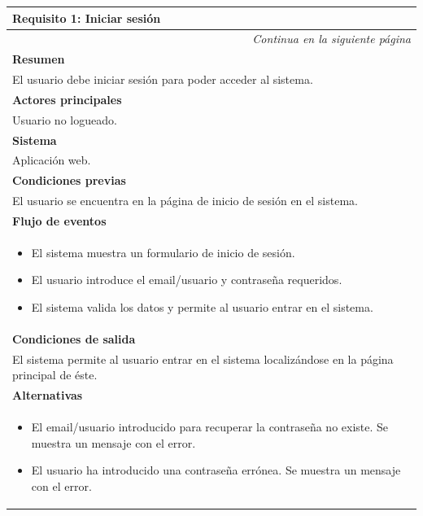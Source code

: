 \begin{longtable}{|p{}|}
\hline
 \rowcolor[gray]{.5}
 \color{white}\textbf{Requisito 1: Iniciar sesión} \\
\hline
\endfirsthead
\endhead
\hline \multicolumn{1}{r}{\textit{Continua en la siguiente página}} \\
\endfoot
\endlastfoot
    \rowcolor[gray]{.9}
     \textbf{Resumen}  \\
     \hline
     El usuario debe iniciar sesión para poder acceder al sistema. \\
     \hline
     \rowcolor[gray]{.9}
     \textbf{Actores principales} \\
     \hline
     Usuario no logueado. \\
     \hline
     \rowcolor[gray]{.9}
     \textbf{Sistema} \\
     \hline
     Aplicación web. \\
     \hline
     \rowcolor[gray]{.9}
     \textbf{Condiciones previas} \\
     \hline
     El usuario se encuentra en la página de inicio de sesión en el sistema. \\
     \hline
     \rowcolor[gray]{.9}
     \textbf{Flujo de eventos} \\
     \hline
      \begin{itemize}
         \item El sistema muestra un formulario de inicio de sesión.
         \item El usuario introduce el email/usuario y contraseña requeridos.
         \item El sistema valida los datos y permite al usuario entrar en el sistema.
     \end{itemize} \\
     \hline
     \rowcolor[gray]{.9}
     \textbf{Condiciones de salida} \\
     \hline
     El sistema permite al usuario entrar en el sistema localizándose en la página principal de éste. \\
     \hline
     \rowcolor[gray]{.9}
     \textbf{Alternativas}  \\
     \hline
      \begin{itemize}
        \item El email/usuario introducido para recuperar la contraseña no existe. Se muestra un mensaje con el error.
        \item El usuario ha introducido una contraseña errónea. Se muestra un mensaje con el error.
     \end{itemize} \\
     \hline
\end{longtable}

